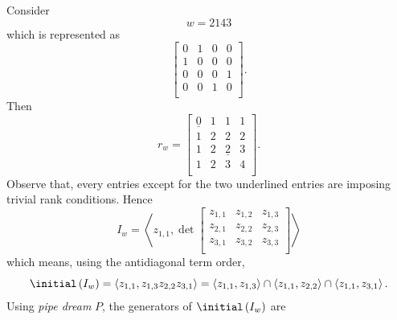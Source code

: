 \documentclass[co439]{subfiles}
\begin{document}
    \begin{example}{}
        Consider
        \begin{equation*}
            w = 2143
        \end{equation*}
        which is represented as
        \begin{equation*}
            \begin{bmatrix}
            	0 & 1 & 0 & 0 \\
            	1 & 0 & 0 & 0 \\
            	0 & 0 & 0 & 1 \\
            	0 & 0 & 1 & 0 \\
            \end{bmatrix}.
        \end{equation*}
        Then
        \begin{equation*}
            r_w = 
            \begin{bmatrix}
                \underline{0} & 1 & 1 & 1 \\
            	1 & 2 & 2 & 2 \\
            	1 & 2 & \underline{2} & 3 \\
            	1 & 2 & 3 & 4 \\
            \end{bmatrix}.
        \end{equation*}
        Observe that, every entries except for the two underlined entries are imposing trivial rank conditions. Hence
        \begin{equation*}
            I_w = \left< z_{1,1}, \det \begin{bmatrix} 
                z_{1,1} & z_{1,2} & z_{1,3} \\
                z_{2,1} & z_{2,2} & z_{2,3} \\
                z_{3,1} & z_{3,2} & z_{3,3} \\
            \end{bmatrix} \right> 
        \end{equation*}
        which means, using the antidiagonal term order,
        \begin{equation*}
            \initial\left( I_w \right) = \left< z_{1,1}, z_{1,3}z_{2,2}z_{3,1} \right> = \left< z_{1,1},z_{1,3} \right>\cap\left< z_{1,1},z_{2,2} \right>\cap\left< z_{1,1},z_{3,1} \right> .
        \end{equation*}
        Using \emph{pipe dream} $P$, the generators of $\initial\left( I_w \right)$ are
        \begin{equation*}

\end{equation*}
\end{example}
\end{document}
